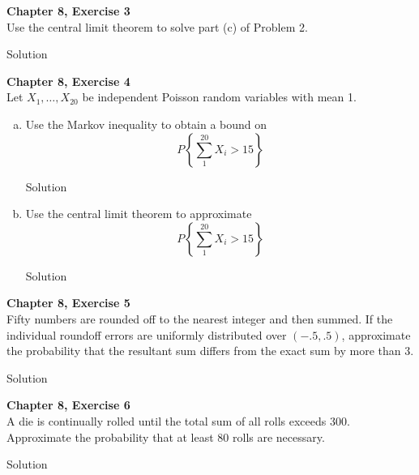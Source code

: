 \documentclass{article}
\begin{document}
\begin{spacing}{1.1}
\newpage
\begin{homeworkProblem}
  {\bf Chapter 8, Exercise 3}\\
  Use the central limit theorem to solve part (c) of Problem 2.
  \begin{homeworkSection}{Solution}
    
  \end{homeworkSection}
\end{homeworkProblem}

\newpage
\begin{homeworkProblem}
  {\bf Chapter 8, Exercise 4}\\
  Let $X_1, \dots, X_{20}$ be independent Poisson random variables 
  with mean 1.
  \begin{enumerate}[(a)]
    \item Use the Markov inequality to obtain a bound on
      \[P\left\{ \sum\limits_1^{20} X_i > 15 \right\}\]
      \begin{homeworkSection}{Solution}
        
      \end{homeworkSection}
    \item Use the central limit theorem to approximate
      \[P\left\{ \sum\limits_1^{20} X_i > 15 \right\}\]
      \begin{homeworkSection}{Solution}
        
      \end{homeworkSection}
  \end{enumerate}
\end{homeworkProblem}

\newpage
\begin{homeworkProblem}
  {\bf Chapter 8, Exercise 5}\\
  Fifty numbers are rounded off to the nearest integer and then summed. 
  If the individual roundoff errors are uniformly distributed over 
  $(−.5, .5)$, approximate the probability that the resultant sum differs 
  from the exact sum by more than 3.
  \begin{homeworkSection}{Solution}
    
  \end{homeworkSection}
\end{homeworkProblem}

\newpage
\begin{homeworkProblem}
  {\bf Chapter 8, Exercise 6}\\
  A die is continually rolled until the total sum of all rolls 
  exceeds 300. Approximate the probability that at least 80 rolls 
  are necessary.
  \begin{homeworkSection}{Solution}
    

\end{homeworkSection}
\end{homeworkProblem}
\end{spacing}
\end{document}
